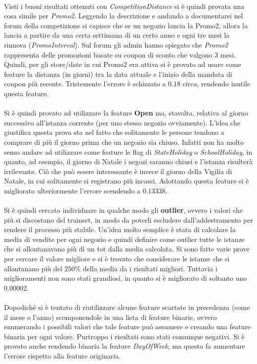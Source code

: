 \\
Visti i buoni risultati ottenuti con \textit{CompetitionDistance} si è quindi provata una cosa simile per \textit{Promo2}. Leggendo la descrizione e andando a documentarsi nel forum della competizione si capisce che se un negozio lancia la Promo2, allora la lancia a partire da una certa settimana di un certo anno e ogni tre mesi la rinnova (\textit{PromoInterval}). Sul forum gli admin hanno spiegato che \textit{Promo2} rappresenta delle promozioni basate su coupon di sconto che valgono 3 mesi. Quindi, per gli store/date in cui Promo2 era attiva si è provato ad usare come feature la distanza (in giorni) tra la data attuale e l'inizio della mandata di coupon più recente. Tristemente l'errore è schizzato a $0.18$ circa, rendendo inutile questa feature.\\
\\
Si è quindi provato ad utilizzare la feature \textbf{Open} ma, stavolta, relativa al giorno successivo all'istanza corrente (per uno stesso negozio ovviamente). L'idea che giustifica questa prova sta nel fatto che solitamente le persone tendono a comprare di più il giorno prima che un negozio sia chiuso. Infatti non ha molto senso andare ad utilizzare come feature le flag di \textit{StateHoliday} o \textit{SchoolHoliday}, in quanto, ad esempio, il giorno di Natale i negozi saranno chiusi e l'istanza risulterà irrilevante. Ciò che può essere interessante è invece il giorno della Vigilia di Natale,  in cui solitamente  si registrano più incassi. Adottando questa feature si è migliorato ulteriormente l'errore scendendo a $0.13338$.\\
\\
Si è quindi cercato individuare in qualche modo gli \textbf{outlier}, ovvero i valori che più si discostano del trainset, in modo da poterli escludere dall'addestramento per rendere il processo più stabile. Un'idea molto semplice è stata di calcolare la media di vendite per ogni negozio e quindi definire come outlier tutte le istanze che si allontanavano più di un tot dalla media calcolata. Si sono fatte varie prove per cercare il valore migliore e si è trovato che considerare le istanze che si allontanano più del $250\%$ della media da i risultati migliori. Tuttavia i miglioramenti non sono stati grandiosi, in quanto si è migliorato di soltanto uno $0.00002$.\\
\\
Dopodiché si è tentato di riutilizzare alcune feature scartate in precedenza (come il mese o l'anno) scomponendole in una lista di feature binarie, ovvero enumerando i possibili valori che tale feature può assumere e creando una feature binaria per ogni valore. Purtroppo i risultati sono stati comunque negativi. Si è provato anche rendendo binaria la feature \textit{DayOfWeek}, ma questo fa aumentare l'errore rispetto alla feature originaria.\\
